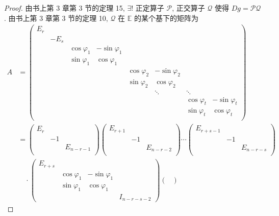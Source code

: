 \documentclass[color=black,device=normal,lang=cn,mode=geye]{elegantnote}
\begin{document}
\begin{proof}
    由书上第 3 章第 3 节的定理 15, $\exists!$ 正定算子 $\mathcal{P}$, 正交算子 $\mathcal{Q}$ 使得 $Dg=\mathcal{PQ}$. 由书上第 3 章第 3 节的定理 10, $\mathcal{Q}$ 在 $\mathbb{E}$ 的某个基下的矩阵为
    \begin{align*}
        A & =\begin{pmatrix}
                E_r \\
                & -E_s \\
                && \cos\varphi_1 & -\sin\varphi_1 \\
                && \sin\varphi_1 & \cos\varphi_1 \\
                &&&& \cos\varphi_2 & -\sin\varphi_2 \\
                &&&& \sin\varphi_2 & \cos\varphi_2 \\
                &&&&& \ddots & \ddots \\
                &&&&&& \cos\varphi_t & -\sin\varphi_t \\
                &&&&&& \sin\varphi_t & \cos\varphi_t \\
            \end{pmatrix} \\
        & =\begin{pmatrix}
            E_r \\
            & -1 \\
            && E_{n-r-1} \\
        \end{pmatrix}\begin{pmatrix}
            E_{r+1} \\
            & -1 \\
            && E_{n-r-2} \\
        \end{pmatrix}\cdots\begin{pmatrix}
            E_{r+s-1} \\
            & -1 \\
            && E_{n-r-s} \\
        \end{pmatrix} \\
        & \quad\cdot\begin{pmatrix}
            E_{r+s} \\
            & \cos\varphi_1 & -\sin\varphi_1 \\
            & \sin\varphi_1 & \cos\varphi_1 \\
            &&& I_{n-r-s-2}
        \end{pmatrix}\begin{pmatrix}

\end{pmatrix}
\end{align*}
\end{proof}
\end{document}
